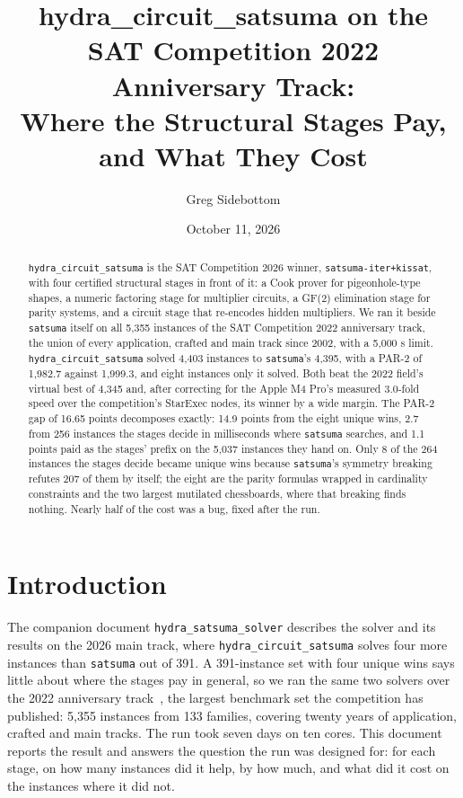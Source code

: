 \documentclass[10pt]{article}
\title{\bfseries hydra\_circuit\_satsuma on the SAT Competition 2022 Anniversary
  Track:\\ Where the Structural Stages Pay, and What They Cost}
\author{Greg Sidebottom}
\date{October 11, 2026}
\newcommand{\hcs}{\texttt{hydra\_circuit\_satsuma}}
\newcommand{\sats}{\texttt{satsuma}}
\newcommand{\partwo}{PAR-2}
\begin{document}
\maketitle

\begin{abstract}
\hcs{} is the SAT Competition 2026 winner, \texttt{satsuma-iter+kissat},
with four certified structural stages in front of it: a Cook prover for
pigeonhole-type shapes, a numeric factoring stage for multiplier circuits,
a GF(2) elimination stage for parity systems, and a circuit stage that
re-encodes hidden multipliers. We ran it beside \sats{} itself on all
5,355 instances of the SAT Competition 2022 anniversary track, the union
of every application, crafted and main track since 2002, with a 5,000 s
limit. \hcs{} solved 4,403 instances to \sats{}'s 4,395, with a \partwo{}
of 1,982.7 against 1,999.3, and eight instances only it solved. Both beat
the 2022 field's virtual best of 4,345 and, after correcting for the Apple
M4 Pro's measured 3.0-fold speed over the competition's StarExec nodes, its
winner by a wide margin. The \partwo{} gap of 16.65 points decomposes exactly: 14.9
points from the eight unique wins, 2.7 from 256 instances the stages
decide in milliseconds where \sats{} searches, and 1.1 points paid as the
stages' prefix on the 5,037 instances they hand on. Only 8 of the 264
instances the stages decide became unique wins because \sats{}'s symmetry
breaking refutes 207 of them by itself; the eight are the parity formulas
wrapped in cardinality constraints and the two largest mutilated
chessboards, where that breaking finds nothing. Nearly half of the cost
was a bug, fixed after the run.
\end{abstract}

\section{Introduction}

The companion document \texttt{hydra\_satsuma\_solver} describes the
solver and its results on the 2026 main track, where \hcs{} solves four
more instances than \sats{} out of 391. A 391-instance set with four
unique wins says little about where the stages pay in general, so we ran
the same two solvers over the 2022 anniversary track~\cite{sc22}, the
largest benchmark set the competition has published: 5,355 instances from
133 families, covering twenty years of application, crafted and main
tracks. The run took seven days on ten cores. This document reports the
result and answers the question the run was designed for: for each stage,
on how many instances did it help, by how much, and what did it cost on
the instances where it did not.
\end{document}
